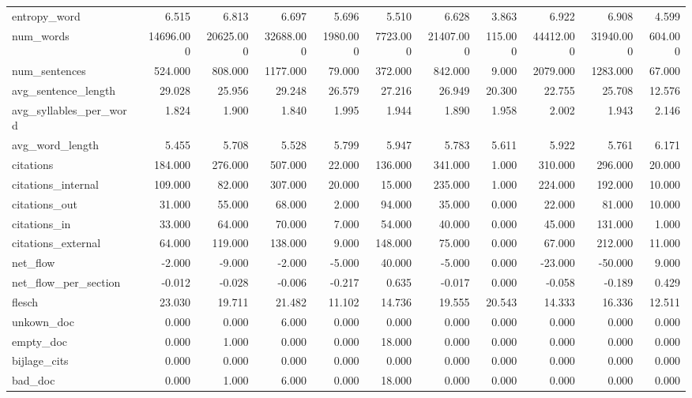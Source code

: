 \begin{tabular}{lrrrrrrrrrr}
\cline{1-11}
entropy\_word & 6.515 & 6.813 & 6.697 & 5.696 & 5.510 & 6.628 & 3.863 & 6.922 & 6.908 & 4.599 \\
\cline{1-11}
num\_words & 14696.000 & 20625.000 & 32688.000 & 1980.000 & 7723.000 & 21407.000 & 115.000 & 44412.000 & 31940.000 & 604.000 \\
\cline{1-11}
num\_sentences & 524.000 & 808.000 & 1177.000 & 79.000 & 372.000 & 842.000 & 9.000 & 2079.000 & 1283.000 & 67.000 \\
\cline{1-11}
avg\_sentence\_length & 29.028 & 25.956 & 29.248 & 26.579 & 27.216 & 26.949 & 20.300 & 22.755 & 25.708 & 12.576 \\
\cline{1-11}
avg\_syllables\_per\_word & 1.824 & 1.900 & 1.840 & 1.995 & 1.944 & 1.890 & 1.958 & 2.002 & 1.943 & 2.146 \\
\cline{1-11}
avg\_word\_length & 5.455 & 5.708 & 5.528 & 5.799 & 5.947 & 5.783 & 5.611 & 5.922 & 5.761 & 6.171 \\
\cline{1-11}
citations & 184.000 & 276.000 & 507.000 & 22.000 & 136.000 & 341.000 & 1.000 & 310.000 & 296.000 & 20.000 \\
\cline{1-11}
citations\_internal & 109.000 & 82.000 & 307.000 & 20.000 & 15.000 & 235.000 & 1.000 & 224.000 & 192.000 & 10.000 \\
\cline{1-11}
citations\_out & 31.000 & 55.000 & 68.000 & 2.000 & 94.000 & 35.000 & 0.000 & 22.000 & 81.000 & 10.000 \\
\cline{1-11}
citations\_in & 33.000 & 64.000 & 70.000 & 7.000 & 54.000 & 40.000 & 0.000 & 45.000 & 131.000 & 1.000 \\
\cline{1-11}
citations\_external & 64.000 & 119.000 & 138.000 & 9.000 & 148.000 & 75.000 & 0.000 & 67.000 & 212.000 & 11.000 \\
\cline{1-11}
net\_flow & -2.000 & -9.000 & -2.000 & -5.000 & 40.000 & -5.000 & 0.000 & -23.000 & -50.000 & 9.000 \\
\cline{1-11}
net\_flow\_per\_section & -0.012 & -0.028 & -0.006 & -0.217 & 0.635 & -0.017 & 0.000 & -0.058 & -0.189 & 0.429 \\
\cline{1-11}
flesch & 23.030 & 19.711 & 21.482 & 11.102 & 14.736 & 19.555 & 20.543 & 14.333 & 16.336 & 12.511 \\
\cline{1-11}
unkown\_doc & 0.000 & 0.000 & 6.000 & 0.000 & 0.000 & 0.000 & 0.000 & 0.000 & 0.000 & 0.000 \\
\cline{1-11}
empty\_doc & 0.000 & 1.000 & 0.000 & 0.000 & 18.000 & 0.000 & 0.000 & 0.000 & 0.000 & 0.000 \\
\cline{1-11}
bijlage\_cits & 0.000 & 0.000 & 0.000 & 0.000 & 0.000 & 0.000 & 0.000 & 0.000 & 0.000 & 0.000 \\
\cline{1-11}
bad\_doc & 0.000 & 1.000 & 6.000 & 0.000 & 18.000 & 0.000 & 0.000 & 0.000 & 0.000 & 0.000 \\
\cline{1-11}
\bottomrule
\end{tabular}

